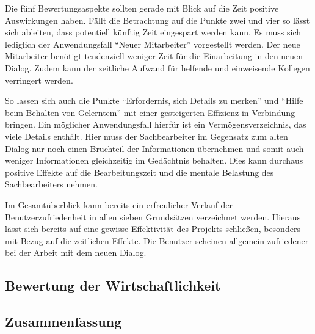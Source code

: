 Die fünf Bewertungsaspekte sollten gerade mit Blick auf die Zeit positive Auswirkungen haben. Fällt die Betrachtung auf die Punkte zwei und vier so lässt sich ableiten, dass potentiell künftig Zeit eingespart werden kann. Es muss sich lediglich der Anwendungsfall \enquote{Neuer Mitarbeiter} vorgestellt werden. Der neue Mitarbeiter benötigt tendenziell weniger Zeit für die Einarbeitung in den neuen Dialog. Zudem kann der zeitliche Aufwand für helfende und einweisende Kollegen verringert werden.

So lassen sich auch die Punkte \enquote{Erfordernis, sich Details zu merken} und \enquote{Hilfe beim Behalten von Gelerntem} mit einer gesteigerten Effizienz in Verbindung bringen. Ein möglicher Anwendungsfall hierfür ist ein Vermögensverzeichnis, das viele Details enthält. Hier muss der Sachbearbeiter im Gegensatz zum alten Dialog nur noch einen Bruchteil der Informationen übernehmen und somit auch weniger Informationen gleichzeitig im Gedächtnis behalten. Dies kann durchaus positive Effekte auf die Bearbeitungszeit und die mentale Belastung des Sachbearbeiters nehmen.

Im Gesamtüberblick kann bereits ein erfreulicher Verlauf der Benutzerzufriedenheit in allen sieben Grundsätzen verzeichnet werden. Hieraus lässt sich bereits auf eine gewisse Effektivität des Projekts schließen, besonders mit Bezug auf die zeitlichen Effekte. Die Benutzer scheinen allgemein zufriedener bei der Arbeit mit dem neuen Dialog.


\subsection{Bewertung der Wirtschaftlichkeit}
\label{sec:KNAZusaetzlichesKriterium}


\subsection{Zusammenfassung}
\label{sec:zusammenfassung}